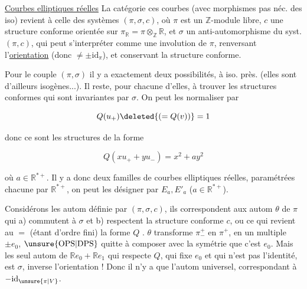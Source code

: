 
\uline{Courbes elliptiques réelles}  La catégorie  ces courbes (avec morphismes pas néc. des iso) revient à celle des  systèmes $(\pi,\sigma,c)$, où $\pi$ est un $\mathbb Z$-module libre,   $c$ une structure  conforme orientée sur $\pi_{\mathbb R}=\pi\otimes_{\mathbb Z}\mathbb R$, et $\sigma$ un anti-automorphisme du syst. $(\pi,c)$, qui peut s'interpréter comme une involution de $\pi$, renversant l'\uline{orientation}  (donc $\ne\pm\mathrm{id}_\pi$), et conservant la structure conforme.

Pour le couple $(\pi,\sigma)$ il y a exactement deux possibilités, à iso. près.  (elles sont d'ailleurs isogènes...). Il reste, pour chacune d'elles, à trouver les structures conformes qui sont invariantes par $\sigma$. On peut les normaliser par 

\[
Q(u_+)\deleted{(=Q(v))}=1
\]


donc ce sont les structures de la forme

\[
Q(xu_++yu_-)=x^2+ay^2
\]

où $a\in\mathbb R^{*+}$. Il y a donc deux familles de courbes elliptiques réelles, paramétrées chacune par $\mathbb R^{*+}$, on peut les désigner par $E_a,E'_a$ ($a\in\mathbb R^{*+}$). 

Considérons les autom   définie par $(\pi,\sigma,c)$, ils correspondent aux  autom $\theta$ de $\pi$ qui a) commutent à $\sigma$ et b) respectent la structure conforme  $c$,  ou ce qui revient au $=$ (étant d'ordre fini) la forme $Q$ .  $\theta$ transforme $\pi^{+}_{-}$ en $\pi^{+}$,    en un multiple  $\pm e_0$, $\unsure{\mathrm{OPS}|\mathrm{DPS}}$ quitte à composer avec la symétrie  que c'est $e_0$. Mais les seul autom de $\mathbb R e_0+\mathbb R e_1$ qui respecte $Q$, qui fixe $e_0$ et qui n'est pas l'identité, est $\sigma$,   inverse l'orientation ! Donc il n'y a que l'autom universel, correspondant à $-\mathrm{id}_{\unsure{\pi|V}}$.

